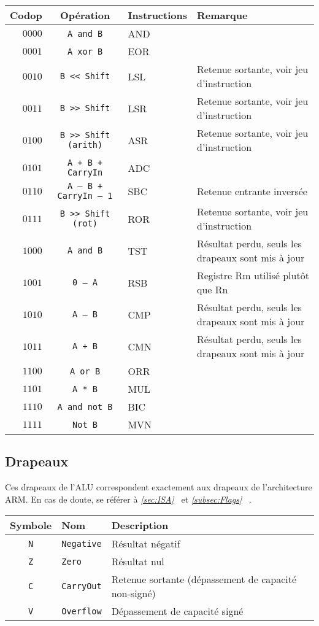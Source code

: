 \begin{tabular}{|r|c|l|l|}
\hline
\textbf{Codop}  & \textbf{Opération}	& \textbf{Instructions} & \textbf{Remarque}\\
\hline

$0000$ & \texttt{A and B}			& AND			&\\
\hline
$0001$ & \texttt{A xor B}			& EOR			&\\
\hline
$0010$ & \texttt{B << Shift}			& LSL			& Retenue sortante, voir jeu d'instruction\\
\hline
$0011$ & \texttt{B >> Shift}			& LSR			& Retenue sortante, voir jeu d'instruction\\
\hline
$0100$ & \texttt{B >> Shift (arith)}		& ASR			& Retenue sortante, voir jeu d'instruction\\
\hline
$0101$ & \texttt{A + B + CarryIn}		& ADC			&\\
\hline
$0110$ & \texttt{A – B + CarryIn – 1}		& SBC			& Retenue entrante inversée\\
\hline
$0111$ & \texttt{B >> Shift (rot)}		& ROR			& Retenue sortante, voir jeu d'instruction\\
\hline
$1000$ & \texttt{A and B}			& TST			& Résultat perdu, seuls les drapeaux sont mis à jour\\
\hline
$1001$ & \texttt{0 – A}				& RSB			& Registre Rm utilisé plutôt que Rn\\
\hline
$1010$ & \texttt{A – B}				& CMP			& Résultat perdu, seuls les drapeaux sont mis à jour\\
\hline
$1011$ & \texttt{A + B}				& CMN			& Résultat perdu, seuls les drapeaux sont mis à jour\\
\hline
$1100$ & \texttt{A or B}			& ORR			&\\
\hline
$1101$ & \texttt{A * B}				& MUL			&\\
\hline
$1110$ & \texttt{A and not B}			& BIC			&\\
\hline
$1111$ & \texttt{Not B}				& MVN			&\\
\hline
\end{tabular}

\subsection{Drapeaux}

Ces drapeaux de l'ALU correspondent exactement aux drapeaux de l'architecture ARM. En cas de doute, se référer à \textit{\ref{sec:ISA}~} et \textit{\ref{subsec:Flags}~} .

\begin{tabular}{|c|l|l|}
\hline
\textbf{Symbole} & \textbf{Nom} & \textbf{Description}\\
\hline

\texttt{N}	& \texttt{Negative}	& Résultat négatif\\
\hline
\texttt{Z}	& \texttt{Zero}		& Résultat nul\\
\hline
\texttt{C}	& \texttt{CarryOut}	& Retenue sortante (dépassement de capacité non-signé)\\
\hline
\texttt{V}	&  \texttt{Overflow}	& Dépassement de capacité signé\\

\hline
\end{tabular}
